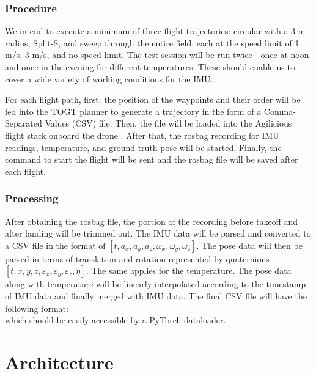 \documentclass{article} %
\begin{document}
\subsubsection{Procedure}

We intend to execute a minimum of three flight trajectories: circular with a 3 m radius, Split-S, and sweep through the entire field; each at the speed limit of 1 m/s, 3 m/s, and no speed limit. The test session will be run twice - once at noon and once in the evening for different temperatures. These should enable us to cover a wide variety of working conditions for the IMU.

For each flight path, first, the position of the waypoints and their order will be fed into the TOGT planner to generate a trajectory in the form of a Comma-Separated Values (CSV) file. Then, the file will be loaded into the Agilicious flight stack onboard the drone \citep{Foehn_2022}. After that, the rosbag recording for IMU readings, temperature, and ground truth pose will be started. Finally, the command to start the flight will be sent and the rosbag file will be saved after each flight.

\subsubsection{Processing}

After obtaining the rosbag file, the portion of the recording before takeoff and after landing will be trimmed out. The IMU data will be parsed and converted to a CSV file in the format of \([t, a_x, a_y, a_z, \omega_x, \omega_y, \omega_z]\). The pose data will then be parsed in terms of translation and rotation represented by quaternions \([t, x, y, z, \varepsilon_x, \varepsilon_y, \varepsilon_z, \eta]\). The same applies for the temperature. The pose data along with temperature will be linearly interpolated according to the timestamp of IMU data and finally merged with IMU data. The final CSV file will have the following format:
\begin{equation}
  [t, a_x, a_y, a_z, \omega_x, \omega_y, \omega_z, x, y, z, \varepsilon_x, \varepsilon_y, \varepsilon_z, \eta, \mathrm{temp}]
\end{equation}
which should be easily accessible by a PyTorch dataloader.



\section{Architecture}
\end{document}
